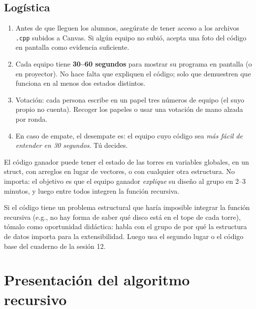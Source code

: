 \documentclass[12pt, oneside]{article}
\begin{document}
\subsection{Logística}

\begin{enumerate}
  \item Antes de que lleguen los alumnos, asegúrate de tener acceso a los
        archivos \texttt{.cpp} subidos a Canvas.  Si algún equipo no subió,
        acepta una foto del código en pantalla como evidencia suficiente.

  \item Cada equipo tiene \textbf{30--60 segundos} para mostrar su programa
        en pantalla (o en proyector).  No hace falta que expliquen el código;
        solo que demuestren que funciona en al menos dos estados distintos.

  \item Votación: cada persona escribe en un papel tres números de equipo
        (el suyo propio no cuenta).  Recoger los papeles o usar una votación
        de mano alzada por ronda.

  \item En caso de empate, el desempate es: el equipo cuyo código sea
        \textit{más fácil de entender en 30 segundos}.  Tú decides.
\end{enumerate}

\begin{notaprofesor}
  El código ganador puede tener el estado de las torres en variables
  globales, en un struct, con arreglos en lugar de vectores, o con
  cualquier otra estructura.  No importa: el objetivo es que el equipo
  ganador \textit{explique} su diseño al grupo en 2--3 minutos, y luego
  entre todos integren la función recursiva.

  Si el código tiene un problema estructural que haría imposible integrar
  la función recursiva (e.g., no hay forma de saber qué disco está en el
  tope de cada torre), tómalo como oportunidad didáctica: habla con el
  grupo de por qué la estructura de datos importa para la extensibilidad.
  Luego usa el segundo lugar o el código base del cuaderno de la sesión 12.
\end{notaprofesor}

\section{Presentación del algoritmo recursivo}
\end{document}
